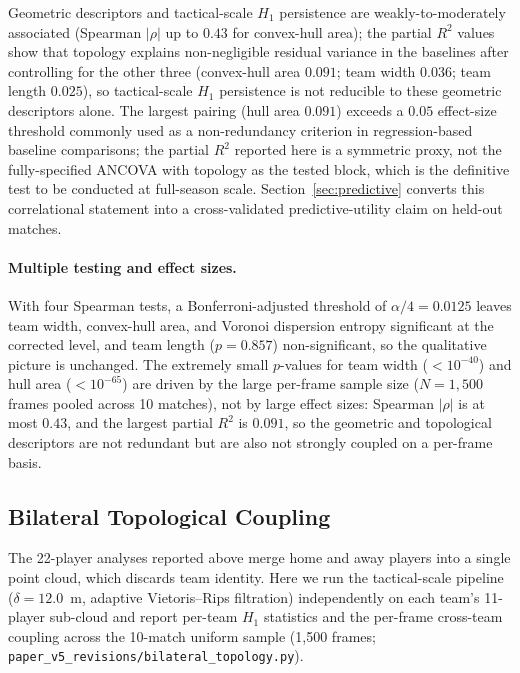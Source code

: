 Geometric descriptors and tactical-scale \(H_1\) persistence are weakly-to-moderately associated (Spearman $|\rho|$ up to $0.43$ for convex-hull area); the partial \(R^2\) values show that topology explains non-negligible residual variance in the baselines after controlling for the other three (convex-hull area $0.091$; team width $0.036$; team length $0.025$), so tactical-scale \(H_1\) persistence is not reducible to these geometric descriptors alone. The largest pairing (hull area $0.091$) exceeds a $0.05$ effect-size threshold commonly used as a non-redundancy criterion in regression-based baseline comparisons; the partial \(R^2\) reported here is a symmetric proxy, not the fully-specified ANCOVA with topology as the tested block, which is the definitive test to be conducted at full-season scale. Section~\ref{sec:predictive} converts this correlational statement into a cross-validated predictive-utility claim on held-out matches.

\paragraph{Multiple testing and effect sizes.} With four Spearman tests, a Bonferroni-adjusted threshold of $\alpha/4 = 0.0125$ leaves team width, convex-hull area, and Voronoi dispersion entropy significant at the corrected level, and team length ($p=0.857$) non-significant, so the qualitative picture is unchanged. The extremely small $p$-values for team width ($<10^{-40}$) and hull area ($<10^{-65}$) are driven by the large per-frame sample size ($N=1{,}500$ frames pooled across 10 matches), not by large effect sizes: Spearman $|\rho|$ is at most $0.43$, and the largest partial $R^2$ is $0.091$, so the geometric and topological descriptors are not redundant but are also not strongly coupled on a per-frame basis.

\subsection{Bilateral Topological Coupling}
\label{sec:bilateral}

The 22-player analyses reported above merge home and away players into a single point cloud, which discards team identity. Here we run the tactical-scale pipeline (\(\delta=12.0\)~m, adaptive Vietoris--Rips filtration) independently on each team's 11-player sub-cloud and report per-team \(H_1\) statistics and the per-frame cross-team coupling across the 10-match uniform sample (1{,}500 frames; \texttt{paper\_v5\_revisions/bilateral\_topology.py}).

